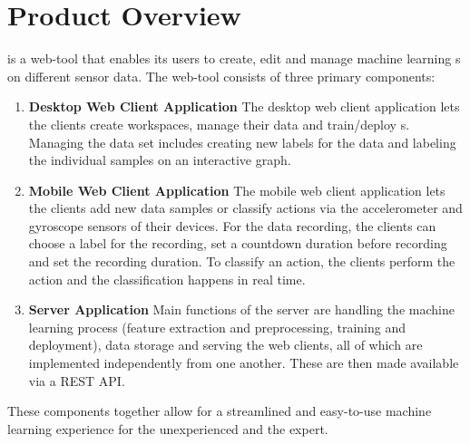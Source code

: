 \section{Product Overview}

 {\pseProjectName} is a web-tool that enables its users to create, edit and manage machine learning s on different \gls{sensor} data. The web-tool consists of three primary components:

\begin{enumerate}
    \item \textbf{Desktop Web Client Application}
    The desktop web client application lets the clients create workspaces, manage their data and train/deploy s. Managing the data set includes creating new labels for the data and labeling the individual samples on an interactive graph.

    \item \textbf{Mobile Web Client Application}
    The mobile web client application lets the clients add new data samples or classify actions via the \gls{accelerometer} and \gls{gyroscope} \glspl{sensor} of their devices. For the data recording, the clients can choose a label for the recording, set a countdown duration before recording and set the recording duration. To classify an action, the clients perform the action and the classification happens in real time.

    \item \textbf{Server Application}
     Main functions of the server are handling the machine learning process (\gls{feature extraction} and preprocessing,  training and deployment), data storage and serving the web clients, all of which are implemented independently from one another. These are then made available via a \gls{REST API}. 
     
\end{enumerate}

These components together allow for a streamlined and easy-to-use machine learning experience for the unexperienced and the expert.